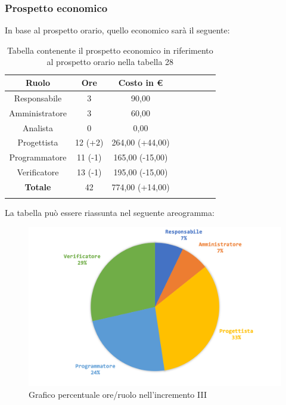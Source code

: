 		\subsubsection{Prospetto economico}
			In base al prospetto orario, quello economico sarà il seguente: 
			
			\begin{longtable}{|c|c|c|c|c|c|c|c}
				\hline
				\rowcolor{lighter-grayer}
				\textbf{Ruolo} & \textbf{Ore} & \textbf{Costo in €} \\
				\hline
				\endfirsthead
				\hline
			Responsabile 	    & 3 & 90,00 \\
			\hline 
			\hline
			Amministratore	  & 3 & 60,00\\
			\hline
			\hline
			Analista 				& 0 & 0,00\\
			\hline
			\hline
			Progettista 		  & 12 (+2) & 264,00 (+44,00)\\
			\hline
			\hline
			Programmatore 	 & 11 (-1) & 165,00 (-15,00) \\
			\hline
			\hline
			Verificatore 		  & 13 (-1) & 195,00 (-15,00)\\
			\hline
			\textbf{Totale} 	& 42 & 774,00 (+14,00)\\
			\hline 
				
				\caption{Tabella contenente il prospetto economico in riferimento al prospetto orario nella tabella 28}
			\end{longtable}
			\pagebreak
			
			La tabella può essere riassunta nel seguente areogramma:
			\begin{figure}[H]
				\centering
				\includegraphics[width=0.8\linewidth]{images/consuntivo/ConsIncr3-2.png}
				\caption{Grafico percentuale ore/ruolo nell'incremento III}
				\label{fig:grafico costi ruolo incremento III}
			\end{figure}

